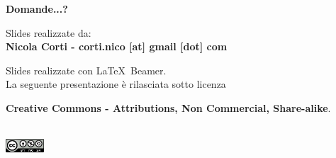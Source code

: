 \documentclass[xcolor=svgnames,11pt]{beamer}
\begin{document}
\begin{frame}{}
\begin{center}
\begin{Huge}
{\color{green_raspi} \textbf{Domande...?}}
\end{Huge}

\vspace{1.5cm}
\begin{small}
Slides realizzate da:\\
\textbf{Nicola Corti - corti.nico [at] gmail [dot] com}\\

\bigskip

Slides realizzate con \LaTeX\ Beamer.\\
La seguente presentazione \`e rilasciata sotto licenza\\
\begin{footnotesize}	\textbf{Creative Commons - Attributions, Non Commercial, Share-alike}.
\end{footnotesize}
\\
\medskip
\includegraphics[height=0.5cm]{cc.png}

\end{small}
\end{center}
\end{frame}
\end{document}
